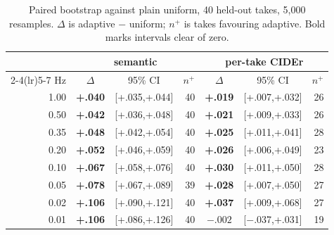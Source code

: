 \documentclass[journal]{IEEEtran}
\begin{document}
\begin{table}[t]
\caption{Paired bootstrap against plain uniform, 40 held-out takes, 5{,}000
resamples. $\Delta$ is adaptive $-$ uniform; $n^{+}$ is takes favouring adaptive.
Bold marks intervals clear of zero.}
\label{tab:sig}
\centering
\footnotesize
\setlength{\tabcolsep}{3pt}
\begin{tabular}{rccrccr}
\toprule
& \multicolumn{3}{c}{semantic} & \multicolumn{3}{c}{per-take CIDEr} \\
\cmidrule(lr){2-4}\cmidrule(lr){5-7}
Hz & $\Delta$ & 95\% CI & $n^{+}$ & $\Delta$ & 95\% CI & $n^{+}$ \\
\midrule
1.00 & \textbf{+.040} & [+.035,+.044] & 40 & \textbf{+.019} & [+.007,+.032] & 26 \\
0.50 & \textbf{+.042} & [+.036,+.048] & 40 & \textbf{+.021} & [+.009,+.033] & 26 \\
0.35 & \textbf{+.048} & [+.042,+.054] & 40 & \textbf{+.025} & [+.011,+.041] & 28 \\
0.20 & \textbf{+.052} & [+.046,+.059] & 40 & \textbf{+.026} & [+.006,+.049] & 23 \\
0.10 & \textbf{+.067} & [+.058,+.076] & 40 & \textbf{+.030} & [+.011,+.050] & 28 \\
0.05 & \textbf{+.078} & [+.067,+.089] & 39 & \textbf{+.028} & [+.007,+.050] & 27 \\
0.02 & \textbf{+.106} & [+.090,+.121] & 40 & \textbf{+.037} & [+.009,+.068] & 27 \\
0.01 & \textbf{+.106} & [+.086,+.126] & 40 & $-.002$ & [$-$.037,+.031] & 19 \\
\bottomrule
\end{tabular}
\end{table}
\end{document}
